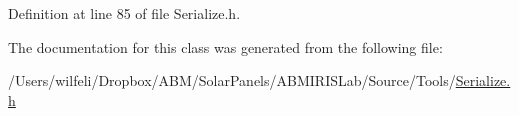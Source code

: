 Definition at line 85 of file Serialize.\+h.



The documentation for this class was generated from the following file\+:\begin{DoxyCompactItemize}
\item 
/\+Users/wilfeli/\+Dropbox/\+A\+B\+M/\+Solar\+Panels/\+A\+B\+M\+I\+R\+I\+S\+Lab/\+Source/\+Tools/\hyperlink{_serialize_8h}{Serialize.\+h}\end{DoxyCompactItemize}
